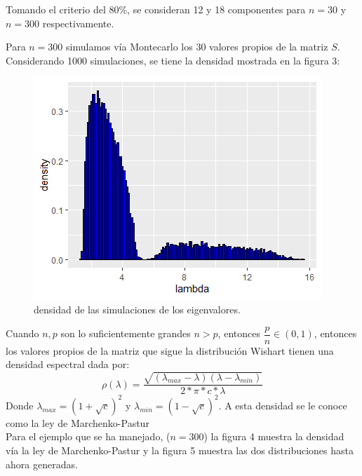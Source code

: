 \documentclass[paper=letter, fontsize=14pt]{scrartcl}
\numberwithin{equation}{section} %
\numberwithin{figure}{section} %
\numberwithin{table}{section} %
\begin{document}
Tomando el criterio del 80\%, se consideran 12 y 18 componentes para $n=30$ y $n=300$ respectivamente.

Para $n=300$ simulamos vía Montecarlo los 30 valores propios de la matriz $S$. Considerando 1000 simulaciones, se tiene la  densidad mostrada en la figura 3:\\

\begin{figure}[h]
\centering
	\includegraphics[scale=.75]{i3.png}
	\caption{densidad de las simulaciones de los eigenvalores.}
\end{figure}

Cuando $n,p$ son lo suficientemente grandes $n>p$, entonces $\dfrac{p}{n}\in(0,1)$, entonces los valores propios de la matriz que sigue la distribución Wishart tienen una densidad espectral dada por:
$$\rho(\lambda)=\dfrac{\sqrt{(\lambda_{max}-\lambda)(\lambda-\lambda_{min})}}{2*\pi*c*\lambda}$$
Donde $\lambda_{max}=(1+\sqrt{c})^2$ y $\lambda_{min}=(1-\sqrt{c})^2$. A esta densidad se le conoce como la ley de Marchenko-Pastur\\

Para el ejemplo que se ha manejado, ($n=300$) la figura 4 muestra la densidad vía la ley de Marchenko-Pastur y la figura 5 muestra las dos distribuciones hasta ahora generadas.\\
\end{document}
